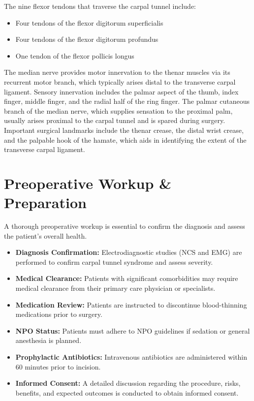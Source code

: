 The nine flexor tendons that traverse the carpal tunnel include:
\begin{itemize}
  \item Four tendons of the flexor digitorum superficialis
  \item Four tendons of the flexor digitorum profundus
  \item One tendon of the flexor pollicis longus
\end{itemize}

The median nerve provides motor innervation to the thenar muscles via its recurrent motor branch, which typically arises distal to the transverse carpal ligament. Sensory innervation includes the palmar aspect of the thumb, index finger, middle finger, and the radial half of the ring finger. The palmar cutaneous branch of the median nerve, which supplies sensation to the proximal palm, usually arises proximal to the carpal tunnel and is spared during surgery. Important surgical landmarks include the thenar crease, the distal wrist crease, and the palpable hook of the hamate, which aids in identifying the extent of the transverse carpal ligament.

\section*{Preoperative Workup \& Preparation}
A thorough preoperative workup is essential to confirm the diagnosis and assess the patient's overall health.

\begin{itemize}
  \item \textbf{Diagnosis Confirmation:} Electrodiagnostic studies (NCS and EMG) are performed to confirm carpal tunnel syndrome and assess severity.
  \item \textbf{Medical Clearance:} Patients with significant comorbidities may require medical clearance from their primary care physician or specialists.
  \item \textbf{Medication Review:} Patients are instructed to discontinue blood-thinning medications prior to surgery.
  \item \textbf{NPO Status:} Patients must adhere to NPO guidelines if sedation or general anesthesia is planned.
  \item \textbf{Prophylactic Antibiotics:} Intravenous antibiotics are administered within 60 minutes prior to incision.
  \item \textbf{Informed Consent:} A detailed discussion regarding the procedure, risks, benefits, and expected outcomes is conducted to obtain informed consent.
\end{itemize}

